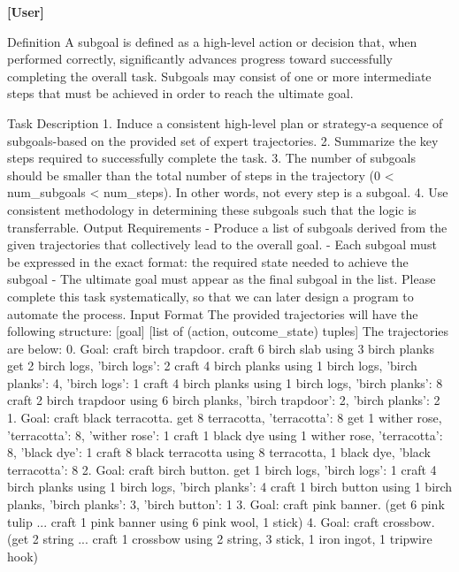 


\textbf{[User]}
\begin{UserTurn}
Definition
A subgoal is defined as a high-level action or decision that, when performed correctly, significantly advances progress toward successfully completing the overall task. Subgoals may consist of one or more intermediate steps that must be achieved in order to reach the ultimate goal.

Task Description
1. Induce a consistent high-level plan or strategy-a sequence of subgoals-based on the provided set of expert trajectories.
2. Summarize the key steps required to successfully complete the task.
3. The number of subgoals should be smaller than the total number of steps in the trajectory (0 < num_subgoals < num_steps). In other words, not every step is a subgoal.
4. Use consistent methodology in determining these subgoals such that the logic is transferrable.
Output Requirements
- Produce a list of subgoals derived from the given trajectories that collectively lead to the overall goal.
- Each subgoal must be expressed in the exact format:
  the required state needed to achieve the subgoal
- The ultimate goal must appear as the final subgoal in the list.
Please complete this task systematically, so that we can later design a program to automate the process.
Input Format
The provided trajectories will have the following structure:
[goal]
[list of (action, outcome_state) tuples]
The trajectories are below:
0.
Goal: craft birch trapdoor.
craft 6 birch slab using 3 birch planks
get 2 birch logs, {'birch logs': 2}
craft 4 birch planks using 1 birch logs, {'birch planks': 4, 'birch logs': 1}
craft 4 birch planks using 1 birch logs, {'birch planks': 8}
craft 2 birch trapdoor using 6 birch planks, {'birch trapdoor': 2, 'birch planks': 2}
1.
Goal: craft black terracotta.
get 8 terracotta, {'terracotta': 8}
get 1 wither rose, {'terracotta': 8, 'wither rose': 1}
craft 1 black dye using 1 wither rose, {'terracotta': 8, 'black dye': 1}
craft 8 black terracotta using 8 terracotta, 1 black dye, {'black terracotta': 8}
2.
Goal: craft birch button.
get 1 birch logs, {'birch logs': 1}
craft 4 birch planks using 1 birch logs, {'birch planks': 4}
craft 1 birch button using 1 birch planks, {'birch planks': 3, 'birch button': 1}
3.
Goal: craft pink banner.
(get 6 pink tulip ... craft 1 pink banner using 6 pink wool, 1 stick)
4.
Goal: craft crossbow.
(get 2 string ... craft 1 crossbow using 2 string, 3 stick, 1 iron ingot, 1 tripwire hook)
\end{UserTurn}


